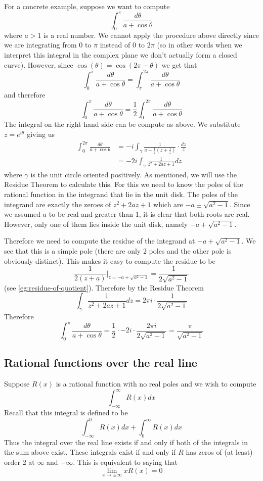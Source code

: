 For a concrete example, suppose we want to compute
$$\int_0^\pi \frac{d\theta}{a + \cos \theta}$$
where $a > 1$ is a real number.
We cannot apply the procedure above directly since we are integrating from $0$ to $\pi$ instead of $0$ to $2\pi$ (so in other words when we interpret this integral in the complex plane we don't actually form a closed curve). However, since $\cos(\theta) = \cos(2 \pi - \theta)$ we get that 
$$\int_0^\pi \frac{d\theta}{a + \cos \theta} = \int_\pi^{2\pi} \frac{d\theta}{a + \cos \theta}$$
and therefore
$$\int_0^\pi \frac{d\theta}{a + \cos \theta} = \frac{1}{2}\int_0^{2\pi} \frac{d\theta}{a + \cos \theta}$$
The integral on the right hand side can be compute as above. We substitute $z = e^{i \theta}$ giving us 
\begin{align*}
    \int_0^{2\pi} \frac{d\theta}{a + \cos \theta} &= -i \int_{\gamma} \frac{1}{a + \frac{1}{2}\left(z + \frac{1}{z} \right)} \cdot \frac{dz}{z}\\
    &= -2i \int_{\gamma} \frac{1}{z^2 + 2az + 1} dz
\end{align*}
where $\gamma$ is the unit circle oriented positively. As mentioned, we will use the Residue Theorem to calculate this. For this we need to know the poles of the rational function in the integrand that lie in the unit disk. The poles of the integrand are exactly the zeroes of $z^2 + 2az + 1$ which are $-a \pm \sqrt{a^2 - 1}$. Since we assumed $a$ to be real and greater than 1, it is clear that both roots are real. However, only one of them lies inside the unit disk, namely $-a + \sqrt{a^2 - 1}$. 

Therefore we need to compute the residue of the integrand at $-a + \sqrt{a^2 - 1}$. We see that this is a simple pole (there are only 2 poles and the other pole is obviously distinct). This makes it easy to compute the residue to be
$$ \frac{1}{2(z + a)} \bigg|_{z = -a + \sqrt{a^2 - 1}} = \frac{1}{2\sqrt{a^2 - 1}} $$
(see \autoref{eg:residue-of-quotient}). Therefore by the Residue Theorem
$$ \int_\gamma \frac{1}{z^2 + 2az + 1}dz = 2\pi i \cdot \frac{1}{2\sqrt{a^2 - 1}} $$
Therefore 
$$ \int_0^\pi \frac{d\theta}{a + \cos \theta} = \frac{1}{2} \cdot -2i \cdot \frac{2\pi i}{2\sqrt{a^2 - 1}} = \frac{\pi}{\sqrt{a^2 - 1}}$$

\subsection{Rational functions over the real line}
Suppose $R(x)$ is a rational function with no real poles and we wish to compute
$$\int_{-\infty}^{\infty} R(x) dx$$
Recall that this integral is defined to be
$$\int_{-\infty}^0 R(x) dx + \int_0^{\infty} R(x) dx$$
Thus the integral over the real line exists if and only if both of the integrals in the sum above exist. These integrals exist if and only if $R$ has zeros of (at least) order 2 at $\infty$ and $-\infty$. This is equivalent to saying that 
$$\lim_{x \to \pm \infty} xR(x) = 0$$

